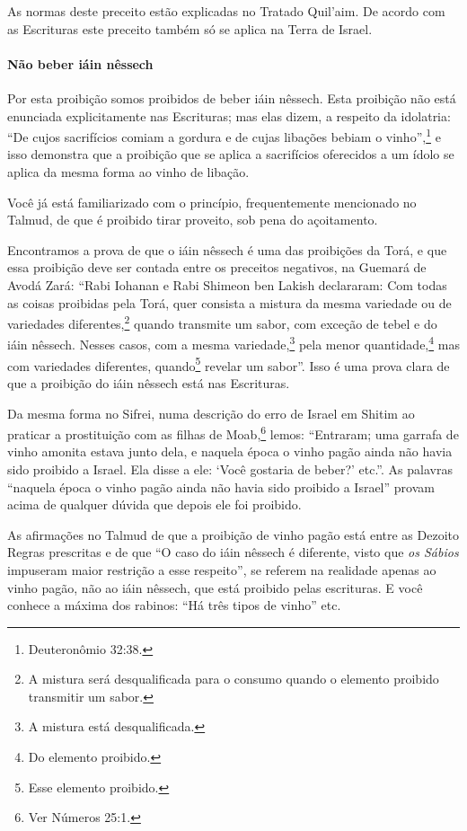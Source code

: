 \begin{multicols}{2}
As normas deste preceito estão explicadas no Tratado Quil'aim\starr. De acordo
com as Escrituras este preceito também só se aplica na Terra de Israel.

\paragraph{Não beber iáin nêssech\starr}

Por esta proibição somos proibidos de beber iáin nêssech\starr. Esta proibição
não está enunciada explicitamente nas Escrituras; mas elas dizem, a
respeito da idolatria: ``De cujos sacrifícios comiam a gordura e de
cujas libações bebiam o vinho'',\footnote{Deuteronômio 32:38.} e isso demonstra
que a proibição que se aplica a sacrifícios oferecidos a um ídolo se
aplica da mesma forma ao vinho de libação.

Você já está familiarizado com o princípio, frequentemente mencionado
no Talmud\starr, de que é proibido tirar proveito, sob pena do açoitamento.

Encontramos a prova de que o iáin nêssech\starr{} é uma das proibições da
Torá\starr, e que essa proibição deve ser contada entre os preceitos
negativos, na Guemará\starr{} de Avodá Zará\starr: ``Rabi Iohanan\starr{} e Rabi Shimeon ben
Lakish\starr{} declararam: Com todas as coisas proibidas pela Torá\starr, quer
consista a mistura da mesma variedade ou de variedades
diferentes,\footnote{A mistura será desqualificada para o consumo quando o elemento
  proibido transmitir um sabor.} quando transmite um sabor, com exceção
de tebel\starr{} e do iáin nêssech\starr. Nesses casos, com a mesma
variedade,\footnote{A mistura está desqualificada.} pela menor
quantidade,\footnote{Do elemento proibido.} mas com variedades diferentes,
quando\footnote{Esse elemento proibido.} revelar um sabor''. Isso é uma prova clara
de que a proibição do iáin nêssech\starr{} está nas Escrituras.

Da mesma forma no Sifrei\starr, numa descrição do erro de Israel em Shitim\starr{} ao
praticar a prostituição com as filhas de Moab\starr,\footnote{Ver Números 25:1.}
lemos: ``Entraram; uma garrafa de vinho amonita\starr{} estava junto dela, e naquela época o vinho pagão ainda não havia sido proibido a Israel. Ela disse a ele: `Você
gostaria de beber?' etc.''. As palavras ``naquela época o vinho pagão
ainda não havia sido proibido a Israel'' provam acima de qualquer dúvida
que depois ele foi proibido.

As afirmações no Talmud\starr{} de que a proibição de vinho pagão está entre as
Dezoito Regras prescritas e de que ``O caso do iáin nêssech\starr{} é
diferente, visto que \emph{os Sábios} impuseram maior restrição a esse
respeito'', se referem na realidade apenas ao vinho pagão, não ao
iáin nêssech\starr, que está proibido pelas escrituras.
E você conhece a máxima dos rabinos: ``Há três tipos de vinho'' etc.


\end{multicols}
